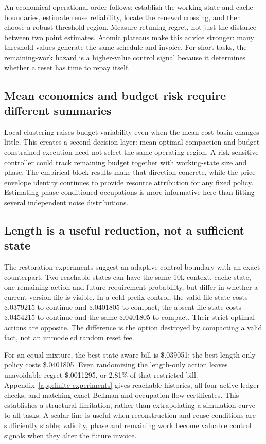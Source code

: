 \documentclass[sigconf,screen,nonacm]{acmart}
\begin{document}
An economical operational order follows: establish the working state and
cache boundaries, estimate reuse reliability, locate the renewal crossing,
and then choose a robust threshold region. Measure retuning regret, not just
the distance between two point estimates. Atomic plateaus make this advice
stronger: many threshold values generate the same schedule and invoice.
For short tasks, the remaining-work hazard is a higher-value control signal
because it determines whether a reset has time to repay itself.

\subsection{Mean economics and budget risk require different summaries}

Local clustering raises budget variability even when the mean cost basin
changes little. This creates a second decision layer: mean-optimal compaction
and budget-constrained execution need not select the same operating region.
A risk-sensitive controller could track remaining budget together with
working-state size and phase. The empirical block results make that direction
concrete, while the price-envelope identity continues to provide resource
attribution for any fixed policy. Estimating phase-conditioned occupations
is more informative here than fitting several independent noise distributions.

\subsection{Length is a useful reduction, not a sufficient state}

The restoration experiments suggest an adaptive-control boundary with an
exact counterpart. Two reachable states can have the same 10k context, cache
state, one remaining action and future requirement probability, but differ
in whether a current-version file is visible. In a cold-prefix control,
the valid-file state costs \$.0379215 to continue and \$.0401805 to compact;
the absent-file state costs \$.0454215 to continue and the same \$.0401805
to compact. Their strict optimal actions are opposite. The difference is the
option destroyed by compacting a valid fact, not an unmodeled random reset fee.

For an equal mixture, the best state-aware bill is \$.039051; the best
length-only policy costs \$.0401805. Even randomizing the length-only action
leaves unavoidable regret \$.0011295, or 2.81\% of that restricted bill.
Appendix~\ref{app:finite-experiments} gives reachable histories, all-four-active
ledger checks, and matching exact Bellman and occupation-flow certificates.
This establishes a structural limitation, rather than extrapolating a
simulation curve to all tasks. A scalar line is useful when reconstruction
and reuse conditions are sufficiently stable; validity, phase and remaining
work become valuable control signals when they alter the future invoice.
\end{document}
